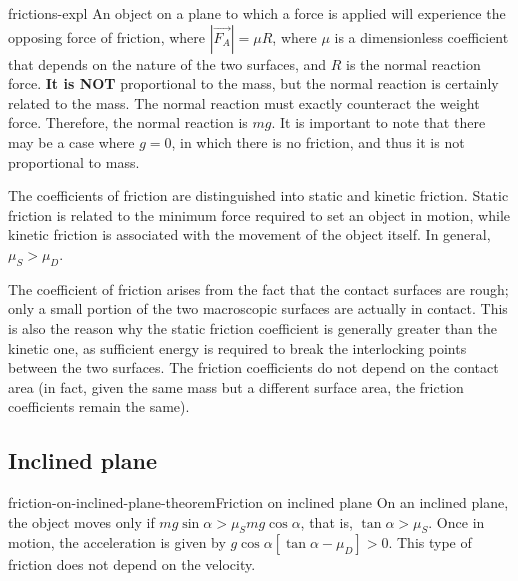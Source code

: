 \documentclass[preview]{standalone}
\begin{document}
\begin{snippet}{frictions-expl}
    An object on a plane to which a force is applied will experience the opposing force  
    of friction, where \(|\vec{F_A}| = \mu R\),  
    where \(\mu\) is a dimensionless coefficient that depends on the nature of the two surfaces,  
    and \(R\) is the normal reaction force. \textbf{It is NOT} proportional to the mass,  
    but the normal reaction is certainly related to the mass.  
    The normal reaction must exactly counteract the weight force.  
    Therefore, the normal reaction is \(mg\).  
    It is important to note that there may be a case where \(g=0\),  
    in which there is no friction, and thus it is not proportional to mass.  
    
    The coefficients of friction are distinguished into static and kinetic friction.  
    Static friction is related to the minimum force required to set an object in motion,  
    while kinetic friction is associated with the movement of the object itself.  
    In general, \(\mu_S > \mu_D\).  
    
    The coefficient of friction arises from the fact that the contact surfaces are rough;  
    only a small portion of the two macroscopic surfaces are actually in contact.  
    This is also the reason why the static friction coefficient is generally  
    greater than the kinetic one, as sufficient energy is required  
    to break the interlocking points between the two surfaces.  
    The friction coefficients do not depend on the contact area (in fact,  
    given the same mass but a different surface area,  
    the friction coefficients remain the same).  
\end{snippet}

\subsection{Inclined plane}

\begin{snippettheorem}{friction-on-inclined-plane-theorem}{Friction on inclined plane}
    On an inclined plane, the object moves only if \(mg\sin\alpha > \mu_S mg\cos\alpha\),  
    that is, \(\tan \alpha > \mu_S\).  
    Once in motion, the acceleration is given by \(g\cos\alpha\left[\tan\alpha-\mu_D\right]>0\).  
    This type of friction does not depend on the velocity.  
\end{snippettheorem}
\end{document}
